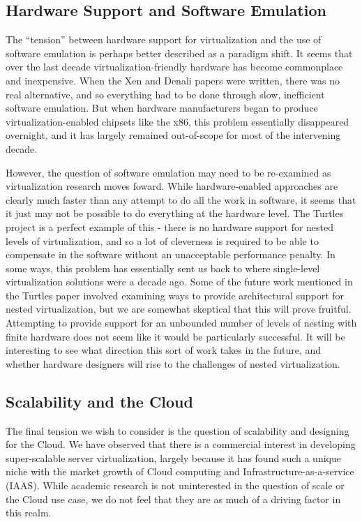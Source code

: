 \documentclass[letterpaper, twocolumn]{article}
\begin{document}
\subsection{Hardware Support and Software Emulation}
\label{sec:relns/hard-emul}

The ``tension'' between hardware support for virtualization and the use of software
emulation is perhaps better described as a paradigm shift.  It seems
that over the last decade virtualization-friendly hardware has become commonplace
and inexpensive.  When the Xen and Denali papers were written, there was no real
alternative, and so everything had to be done through slow, inefficient software emulation.
But when hardware manufacturers began to produce virtualization-enabled chipsets
like the x86, this problem essentially disappeared overnight, and it has largely
remained out-of-scope for most of the intervening decade.

However, the question of software emulation may need to be re-examined as virtualization
research moves foward.  While hardware-enabled approaches are clearly much faster
than any attempt to do all the work in software, it seems that it just may not be possible to do
everything at the hardware level.  The Turtles project is a perfect example of this - there
is no hardware support for nested levels of virtualization, and so a lot of cleverness
is required to be able to compensate in the software without an unacceptable performance
penalty.  In some ways, this problem has essentially sent us back to where single-level virtualization
solutions were a decade ago.  Some of the future work mentioned in the Turtles paper involved
examining ways to provide architectural support for nested virtualization, but
we are somewhat skeptical that this will prove fruitful.  Attempting to provide
support for an unbounded number of levels of nesting with finite hardware does
not seem like it would be particularly successful.  It will be interesting to
see what direction this sort of work takes in the future, and whether hardware
designers will rise to the challenges of nested virtualization.

\subsection{Scalability and the Cloud}
\label{sec:relns/scale}

The final tension we wish to consider is the question of scalability and designing
for the Cloud.  We have observed
that there is a commercial interest in developing super-scalable server virtualization,
largely because it has found such a unique niche with the market growth of Cloud computing
and Infrastructure-as-a-service (IAAS).  While academic research is not uninterested in the question
of scale or the Cloud use case, we do not feel that they are as much of a driving factor in this realm.
\end{document}
